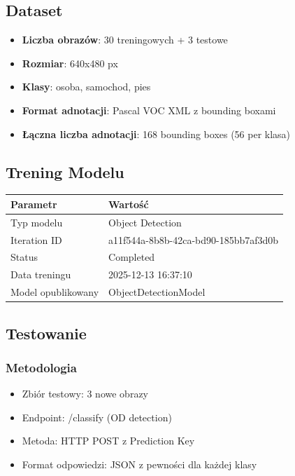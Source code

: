 \documentclass[twoside]{article}
\begin{document}
\subsection{Dataset}

\begin{itemize}
	\item \textbf{Liczba obrazów}: 30 treningowych + 3 testowe
	\item \textbf{Rozmiar}: 640x480 px
	\item \textbf{Klasy}: osoba, samochod, pies
	\item \textbf{Format adnotacji}: Pascal VOC XML z bounding boxami
	\item \textbf{Łączna liczba adnotacji}: 168 bounding boxes (56 per klasa)
\end{itemize}

\subsection{Trening Modelu}

\begin{center}
	\begin{tabular}{|l|l|}
		\hline
		\textbf{Parametr} & \textbf{Wartość} \\
		\hline
		Typ modelu & Object Detection \\
		Iteration ID & a11f544a-8b8b-42ca-bd90-185bb7af3d0b \\
		Status & Completed \\
		Data treningu & 2025-12-13 16:37:10 \\
		Model opublikowany & ObjectDetectionModel \\
		\hline
	\end{tabular}
\end{center}

\subsection{Testowanie}

\subsubsection{Metodologia}

\begin{itemize}
	\item Zbiór testowy: 3 nowe obrazy
	\item Endpoint: /classify (OD detection)
	\item Metoda: HTTP POST z Prediction Key
	\item Format odpowiedzi: JSON z pewności dla każdej klasy
\end{itemize}
\end{document}
